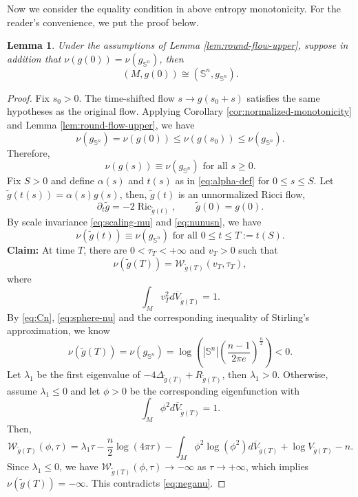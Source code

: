 \documentclass[11pt, reqno]{amsart}
\numberwithin{equation}{section}
\newtheorem{lemma}[theorem]{Lemma}
\theoremstyle{remark}
\DeclareMathOperator{\Ric}{Ric}
\newcommand{\Sph}{\mathbb S}
\newcommand{\dbarV}[1]{d\overline V_{#1}}
\newcommand{\W}{\mathcal{W}}
\begin{document}
{Now we consider the equality condition in above entropy monotonicity. For the reader's convenience, we put the proof below.
\begin{lemma}\label{lemma:equalrigid}
    Under the assumptions of Lemma \ref{lem:round-flow-upper}, suppose in addition that $\nu(g(0))=\nu(g_{\Sph^n})$, then $$(M, g(0))\cong(\Sph^n, g_{\Sph^n}).$$
\end{lemma}
\begin{proof}
    Fix $s_0>0$. The time-shifted flow $s\to g(s_0+s)$ satisfies the same hypotheses as the original flow. Applying Corollary \ref{cor:normalized-monotonicity} and Lemma \ref{lem:round-flow-upper}, we have 
    \begin{equation}
        \nu(g_{\Sph^n})=\nu(g(0))\leq \nu(g(s_0))\leq\nu(g_{\Sph^n}).
    \end{equation}
Therefore, \begin{equation}\label{eq:nunusn}
\nu(g(s))\equiv\nu(g_{\Sph^n})\text{ for all } s\geq0.
\end{equation}
Fix $S>0$ and define $\alpha(s)$ and $t(s)$ as in \eqref{eq:alpha-def} for $0\le s\le S$. Let $\widetilde{g}(t(s))=\alpha(s)g(s)$, then, $\widetilde{g}(t)$ is an unnormalized Ricci flow,
$$\partial_t \widetilde{g}=-2\Ric_{ \widetilde{g}(t)},\qquad \widetilde{g}(0)=g(0).$$
By scale invariance \eqref{eq:scaling-mu} and \eqref{eq:nunusn}, we have 
 \begin{equation}\label{eq:widnusn}
\nu(\widetilde{g}(t))\equiv\nu(g_{\Sph^n})\text{ for all } 0\leq t\leq T:=t(S).
\end{equation}
\textbf{Claim:} At time $T$, there are $0<\tau_T<+\infty$ and $v_T> 0$ such that 
\begin{equation}
\nu(\widetilde{g}(T))=\W_{\widetilde{g}(T)}(v_T, \tau_T),
\end{equation}
where $$\int_Mv^2_T\dbarV{\widetilde{g}(T)}=1.$$
By \eqref{eq:Cn}, \eqref{eq:sphere-nu} and the corresponding inequality of Stirling's approximation, we know 
\begin{equation}\label{eq:neganu}
\nu(\widetilde{g}(T))=\nu(g_{\Sph^n})=\log\left(|\Sph^n|\left(\frac{n-1}{2\pi e}\right)^{\frac{n}{2}}\right)<0.
\end{equation}
Let $\lambda_{1}$ be the first eigenvalue of $-4\Delta_{\widetilde{g}(T)}+R_{\widetilde{g}(T)}$, then $\lambda_1>0$. Otherwise, assume $\lambda_1\le0$ and let $\phi>0$ be the corresponding eigenfunction with $$\int_M\phi^2\dbarV{\widetilde g(T)}=1.$$
Then, $$\W_{\widetilde g(T)}(\phi, \tau)=\lambda_1\tau-\frac{n}{2}\log(4\pi\tau)-\int_M\phi^2\log(\phi^2)\dbarV{\widetilde{g}(T)}+\log V_{\widetilde{g}(T)}-n.$$
Since $\lambda_1\le0$, we have $\W_{\tilde g(T)}(\phi, \tau)\to-\infty$ as $\tau\to +\infty$, which implies $\nu(\widetilde{g}(T))=-\infty$. This contradicts \eqref{eq:neganu}.


\end{proof}}
\end{document}
